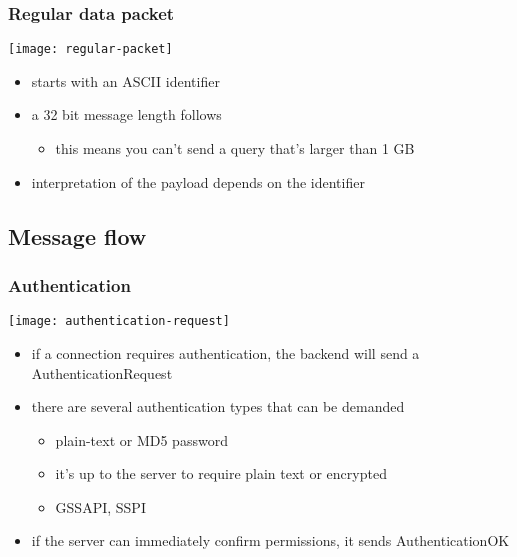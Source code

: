 \documentclass{beamer}
\begin{document}
\begin{frame}
  \frametitle{Regular data packet}

  \begin{center}
    \texttt{[image: regular-packet]}
  \end{center}

  \begin{itemize}
  \item starts with an ASCII identifier
  \item a 32 bit message length follows
    \begin{itemize}
    \item this means you can't send a query that's larger than 1 GB
    \end{itemize}
  \item interpretation of the payload depends on the identifier
  \end{itemize}
\end{frame}

\subsection{Message flow}

\begin{frame}
  \frametitle{Authentication}

  \begin{center}
    \texttt{[image: authentication-request]}
  \end{center}

  \begin{itemize}
  \item if a connection requires authentication, the backend will send a
    AuthenticationRequest
  \item there are several authentication types that can be demanded
    \begin{itemize}
    \item plain-text or MD5 password
    \item it's up to the server to require plain text or encrypted
    \item GSSAPI, SSPI
    \end{itemize}
  \item if the server can immediately confirm permissions, it sends
    AuthenticationOK
  \end{itemize}
\end{frame}
\end{document}
